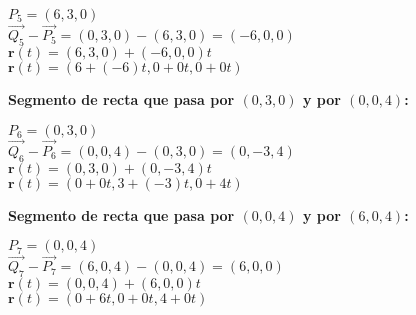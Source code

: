 \documentclass{article}
\begin{document}
$P_5 = (6,3,0)$ \\
$\vec{Q_5} - \vec{P_5} = (0,3,0) - (6,3,0) = (-6,0,0)$ \\
$\mathbf{r}(t) = (6,3,0) + (-6,0,0)t$ \\
$\mathbf{r}(t) = (6 + (-6)t, 0 + 0t, 0 + 0t)$

\textbf{Segmento de recta que pasa por $(0,3,0)$ y por $(0,0,4)$:}

$P_6 = (0,3,0)$ \\
$\vec{Q_6} - \vec{P_6} = (0,0,4) - (0,3,0) = (0, -3, 4)$ \\
$\mathbf{r}(t) = (0,3,0) + (0, -3, 4)t$ \\
$\mathbf{r}(t) = (0 + 0t, 3 + (-3)t, 0 + 4t)$

\textbf{Segmento de recta que pasa por $(0,0,4)$ y por $(6,0,4)$:}

$P_7 = (0,0,4)$ \\
$\vec{Q_7} - \vec{P_7} = (6,0,4) - (0,0,4) = (6,0,0)$ \\
$\mathbf{r}(t) = (0,0,4) + (6,0,0)t$ \\
$\mathbf{r}(t) = (0 + 6t, 0 + 0t, 4 + 0t)$
\end{document}
